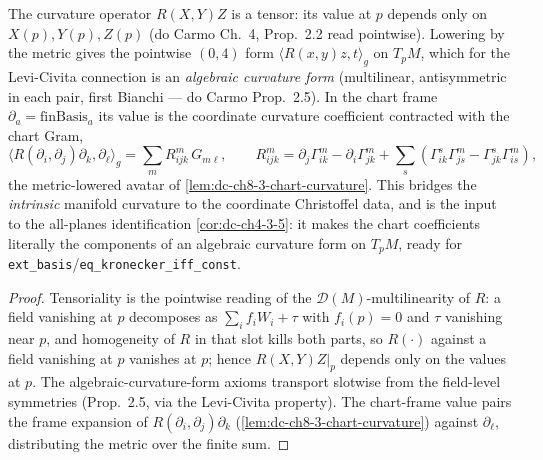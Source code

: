 \begin{lemma}
  \label{lem:dc-ch8-3-pointwise-curvature-form}
  \leanok
  The curvature operator $R(X,Y)Z$ is a tensor: its value at $p$ depends only on
  $X(p),Y(p),Z(p)$ (do Carmo Ch.~4, Prop.~2.2 read pointwise). Lowering by the
  metric gives the pointwise $(0,4)$ form $\langle R(x,y)z,t\rangle_g$ on
  $T_pM$, which for the Levi-Civita connection is an \emph{algebraic curvature
  form} (multilinear, antisymmetric in each pair, first Bianchi — do Carmo
  Prop.~2.5). In the chart frame $\partial_a=\text{finBasis}_a$ its value is the
  coordinate curvature coefficient contracted with the chart Gram,
  $$\langle R(\partial_i,\partial_j)\partial_k,\partial_\ell\rangle_g
    = \sum_m R^m_{ijk}\,G_{m\ell},\qquad
    R^m_{ijk}=\partial_j\Gamma^m_{ik}-\partial_i\Gamma^m_{jk}
      +\sum_s(\Gamma^s_{ik}\Gamma^m_{js}-\Gamma^s_{jk}\Gamma^m_{is}),$$
  the metric-lowered avatar of \cref{lem:dc-ch8-3-chart-curvature}. This bridges
  the \emph{intrinsic} manifold curvature to the coordinate Christoffel data, and
  is the input to the all-planes identification \cref{cor:dc-ch4-3-5}: it makes the
  chart coefficients literally the components of an algebraic curvature form on
  $T_pM$, ready for \texttt{ext\_basis}/\texttt{eq\_kronecker\_iff\_const}.
\end{lemma}
\begin{proof}
  \leanok
  Tensoriality is the pointwise reading of the $\mathcal D(M)$-multilinearity of
  $R$: a field vanishing at $p$ decomposes as $\sum_i f_i W_i+\tau$ with
  $f_i(p)=0$ and $\tau$ vanishing near $p$, and homogeneity of $R$ in that slot
  kills both parts, so $R(\cdot)$ against a field vanishing at $p$ vanishes at
  $p$; hence $R(X,Y)Z|_p$ depends only on the values at $p$. The
  algebraic-curvature-form axioms transport slotwise from the field-level
  symmetries (Prop.~2.5, via the Levi-Civita property). The chart-frame value
  pairs the frame expansion of $R(\partial_i,\partial_j)\partial_k$
  (\cref{lem:dc-ch8-3-chart-curvature}) against $\partial_\ell$, distributing the
  metric over the finite sum.
\end{proof}

